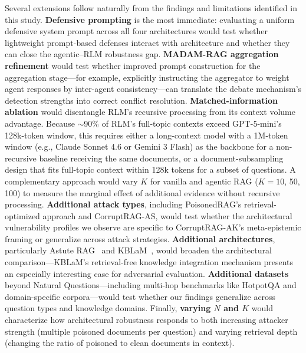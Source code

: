 \documentclass[11pt]{article}
\begin{document}
Several extensions follow naturally from the findings and limitations identified in this study. \textbf{Defensive prompting} is the most immediate: evaluating a uniform defensive system prompt across all four architectures would test whether lightweight prompt-based defenses interact with architecture and whether they can close the agentic--RLM robustness gap. \textbf{MADAM-RAG aggregation refinement} would test whether improved prompt construction for the aggregation stage---for example, explicitly instructing the aggregator to weight agent responses by inter-agent consistency---can translate the debate mechanism's detection strengths into correct conflict resolution. \textbf{Matched-information ablation} would disentangle RLM's recursive processing from its context volume advantage. Because ${\sim}$90\% of RLM's full-topic contexts exceed GPT-5-mini's 128k-token window, this requires either a long-context model with a 1M-token window (e.g., Claude Sonnet 4.6 or Gemini 3 Flash) as the backbone for a non-recursive baseline receiving the same documents, or a document-subsampling design that fits full-topic context within 128k tokens for a subset of questions. A complementary approach would vary $K$ for vanilla and agentic RAG ($K{=}10$, 50, 100) to measure the marginal effect of additional evidence without recursive processing. \textbf{Additional attack types}, including PoisonedRAG's retrieval-optimized approach and CorruptRAG-AS, would test whether the architectural vulnerability profiles we observe are specific to CorruptRAG-AK's meta-epistemic framing or generalize across attack strategies. \textbf{Additional architectures}, particularly Astute RAG~\citep{wang2024astute} and KBLaM~\citep{wang2025kblam}, would broaden the architectural comparison---KBLaM's retrieval-free knowledge integration mechanism presents an especially interesting case for adversarial evaluation. \textbf{Additional datasets} beyond Natural Questions---including multi-hop benchmarks like HotpotQA and domain-specific corpora---would test whether our findings generalize across question types and knowledge domains. Finally, \textbf{varying $N$ and $K$} would characterize how architectural robustness responds to both increasing attacker strength (multiple poisoned documents per question) and varying retrieval depth (changing the ratio of poisoned to clean documents in context).

\end{document}
